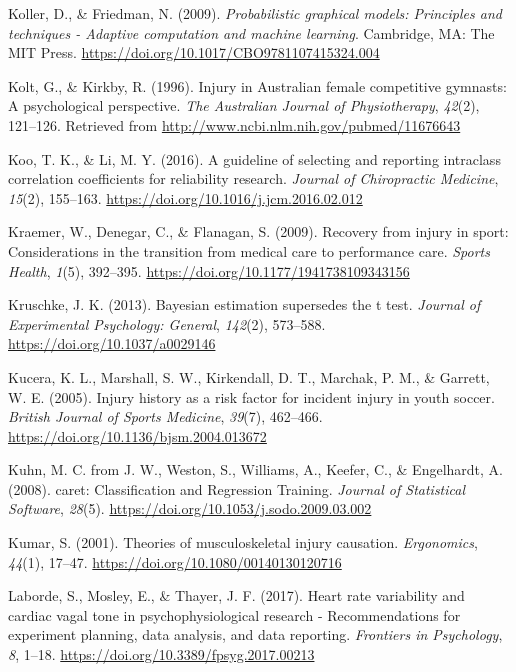 \documentclass[
  english,
  man,floatsintext]{apa6}
\begin{document}
\leavevmode\hypertarget{ref-Koller2009}{}%
Koller, D., \& Friedman, N. (2009). \emph{Probabilistic graphical models: Principles and techniques - Adaptive computation and machine learning}. Cambridge, MA: The MIT Press. \url{https://doi.org/10.1017/CBO9781107415324.004}

\leavevmode\hypertarget{ref-Kolt1996}{}%
Kolt, G., \& Kirkby, R. (1996). Injury in Australian female competitive gymnasts: A psychological perspective. \emph{The Australian Journal of Physiotherapy}, \emph{42}(2), 121--126. Retrieved from \url{http://www.ncbi.nlm.nih.gov/pubmed/11676643}

\leavevmode\hypertarget{ref-Koo2016}{}%
Koo, T. K., \& Li, M. Y. (2016). A guideline of selecting and reporting intraclass correlation coefficients for reliability research. \emph{Journal of Chiropractic Medicine}, \emph{15}(2), 155--163. \url{https://doi.org/10.1016/j.jcm.2016.02.012}

\leavevmode\hypertarget{ref-Kraemer2009}{}%
Kraemer, W., Denegar, C., \& Flanagan, S. (2009). Recovery from injury in sport: Considerations in the transition from medical care to performance care. \emph{Sports Health}, \emph{1}(5), 392--395. \url{https://doi.org/10.1177/1941738109343156}

\leavevmode\hypertarget{ref-Kruschke2013}{}%
Kruschke, J. K. (2013). Bayesian estimation supersedes the t test. \emph{Journal of Experimental Psychology: General}, \emph{142}(2), 573--588. \url{https://doi.org/10.1037/a0029146}

\leavevmode\hypertarget{ref-Kucera2005}{}%
Kucera, K. L., Marshall, S. W., Kirkendall, D. T., Marchak, P. M., \& Garrett, W. E. (2005). Injury history as a risk factor for incident injury in youth soccer. \emph{British Journal of Sports Medicine}, \emph{39}(7), 462--466. \url{https://doi.org/10.1136/bjsm.2004.013672}

\leavevmode\hypertarget{ref-Kuhn2008}{}%
Kuhn, M. C. from J. W., Weston, S., Williams, A., Keefer, C., \& Engelhardt, A. (2008). caret: Classification and Regression Training. \emph{Journal of Statistical Software}, \emph{28}(5). \url{https://doi.org/10.1053/j.sodo.2009.03.002}

\leavevmode\hypertarget{ref-Kumar2001}{}%
Kumar, S. (2001). Theories of musculoskeletal injury causation. \emph{Ergonomics}, \emph{44}(1), 17--47. \url{https://doi.org/10.1080/00140130120716}

\leavevmode\hypertarget{ref-Laborde2017}{}%
Laborde, S., Mosley, E., \& Thayer, J. F. (2017). Heart rate variability and cardiac vagal tone in psychophysiological research - Recommendations for experiment planning, data analysis, and data reporting. \emph{Frontiers in Psychology}, \emph{8}, 1--18. \url{https://doi.org/10.3389/fpsyg.2017.00213}
\end{document}
